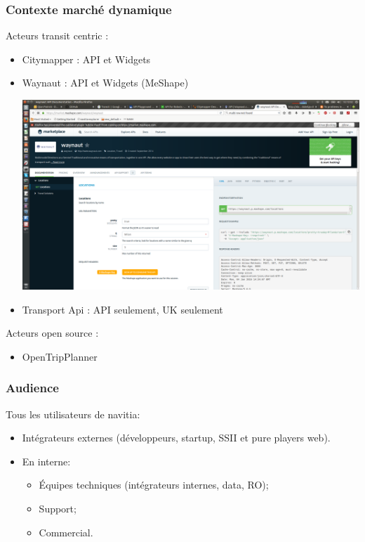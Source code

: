 \documentclass[table]{beamer}
\begin{document}
\begin{frame}
  \frametitle{Contexte marché dynamique}
  \begin{description}
    \item[Acteurs transit centric : ]
  \end{description}
  \begin{itemize}
    \item Citymapper : API et Widgets 
    \item Waynaut  :  API et Widgets (MeShape)
    \begin{center}
      \includegraphics[height=0.25\textheight]{images/Waynaut}
    \end{center}  
    \item Transport Api : API seulement, UK seulement
  \end{itemize}
  \begin{description}
    \item[Acteurs open source : ]
  \end{description}
  \begin{itemize}
    \item OpenTripPlanner
  \end{itemize}
\end{frame}

\begin{frame}
  \frametitle{Audience}

  Tous les utilisateurs de navitia:
  \begin{itemize}
  \item Intégrateurs externes (développeurs, startup, SSII et pure
    players web).
  \item En interne:
    \begin{itemize}
    \item Équipes techniques (intégrateurs internes, data, RO);
    \item Support;
    \item Commercial.
    \end{itemize}
  \end{itemize}
\end{frame}
\end{document}
